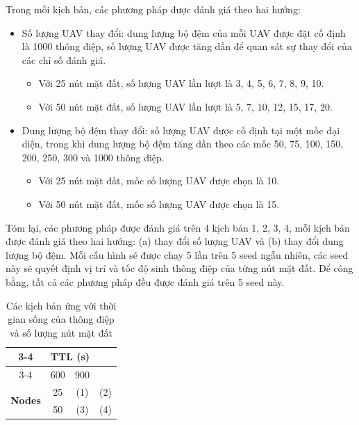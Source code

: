 \documentclass[a4paper]{article}
\begin{document}
Trong mỗi kịch bản, các phương pháp được đánh giá theo hai hướng:
\begin{itemize}
  \item Số lượng UAV thay đổi: dung lượng bộ đệm của mỗi UAV được đặt cố định là 1000 thông điệp, số lượng UAV được tăng dần để quan sát sự thay đổi của các chỉ số đánh giá.
    \begin{itemize}
      \item Với 25 nút mặt đất, số lượng UAV lần lượt là 3, 4, 5, 6, 7, 8, 9, 10.
      \item Với 50 nút mặt đất, số lượng UAV lần lượt là 5, 7, 10, 12, 15, 17, 20.
    \end{itemize}

  \item Dung lượng bộ đệm thay đổi: số lượng UAV được cố định tại một mốc đại diện, trong khi dung lượng bộ đệm tăng dần theo các mốc 50, 75, 100, 150, 200, 250, 300 và 1000 thông điệp.
    \begin{itemize}
      \item Với 25 nút mặt đất, mốc số lượng UAV được chọn là 10.
      \item Với 50 nút mặt đất, mốc số lượng UAV được chọn là 15.
    \end{itemize}
\end{itemize}

Tóm lại, các phương pháp được đánh giá trên 4 kịch bản 1, 2, 3, 4, mỗi kịch bản được đánh giá theo hai hướng: (a) thay đổi số lượng UAV và (b) thay đổi dung lượng bộ đệm. Mỗi cấu hình sẽ được chạy 5 lần trên 5 seed ngẫu nhiên, các seed này sẽ quyết định vị trí và tốc độ sinh thông điệp của từng nút mặt đất. Để công bằng, tất cả các phương pháp đều được đánh giá trên 5 seed này.

\begin{table}[h]
\centering

\begin{tabular}{|c|c|c|c|}
\cline{3-4}
\multicolumn{2}{c|}{} & \multicolumn{2}{c|}{\textbf{TTL (s)}} \\ \cline{3-4}
\multicolumn{2}{c|}{} & 600 & 900 \\ \hline
\multirow{2}{*}{\textbf{Nodes}} 
& 25 & (1) & (2) \\ \cline{2-4}
& 50 & (3) & (4) \\ \hline
\end{tabular}
\caption{Các kịch bản ứng với thời gian sống của thông điệp và số lượng nút mặt đất}
\label{tab:scenario_matrix}
\end{table}
\end{document}
